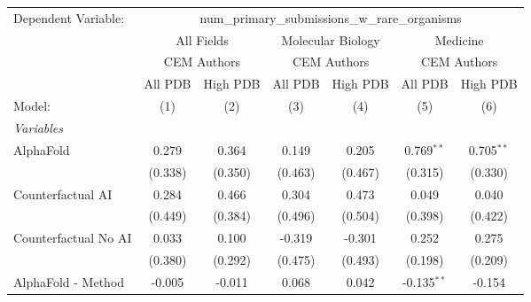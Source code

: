\begingroup
\centering
\begin{tabular}{lcccccc}
   \tabularnewline \midrule \midrule
   Dependent Variable: & \multicolumn{6}{c}{num\_primary\_submissions\_w\_rare\_organisms}\\
 & \multicolumn{2}{c}{All Fields} & \multicolumn{2}{c}{Molecular Biology} & \multicolumn{2}{c}{Medicine} \\
\cmidrule(lr){2-3} \cmidrule(lr){4-5} \cmidrule(lr){6-7}
 & \multicolumn{2}{c}{CEM Authors} & \multicolumn{2}{c}{CEM Authors} & \multicolumn{2}{c}{CEM Authors} \\
\cmidrule(lr){2-3} \cmidrule(lr){4-5} \cmidrule(lr){6-7}
 & \multicolumn{1}{c}{All PDB} & \multicolumn{1}{c}{High PDB} & \multicolumn{1}{c}{All PDB} & \multicolumn{1}{c}{High PDB} & \multicolumn{1}{c}{All PDB} & \multicolumn{1}{c}{High PDB} \\
\cmidrule(lr){2-2} \cmidrule(lr){3-3} \cmidrule(lr){4-4} \cmidrule(lr){5-5} \cmidrule(lr){6-6} \cmidrule(lr){7-7}
   Model:                                                     & (1)           & (2)           & (3)           & (4)           & (5)           & (6)\\  
   \midrule
   \emph{Variables}\\
   AlphaFold                                                  & 0.279         & 0.364         & 0.149         & 0.205         & 0.769$^{**}$  & 0.705$^{**}$\\   
                                                              & (0.338)       & (0.350)       & (0.463)       & (0.467)       & (0.315)       & (0.330)\\   
   Counterfactual AI                                          & 0.284         & 0.466         & 0.304         & 0.473         & 0.049         & 0.040\\   
                                                              & (0.449)       & (0.384)       & (0.496)       & (0.504)       & (0.398)       & (0.422)\\   
   Counterfactual No AI                                       & 0.033         & 0.100         & -0.319        & -0.301        & 0.252         & 0.275\\   
                                                              & (0.380)       & (0.292)       & (0.475)       & (0.493)       & (0.198)       & (0.209)\\   
   AlphaFold - Method                                         & -0.005        & -0.011        & 0.068         & 0.042         & -0.135$^{**}$ & -0.154\\   

\end{tabular}
